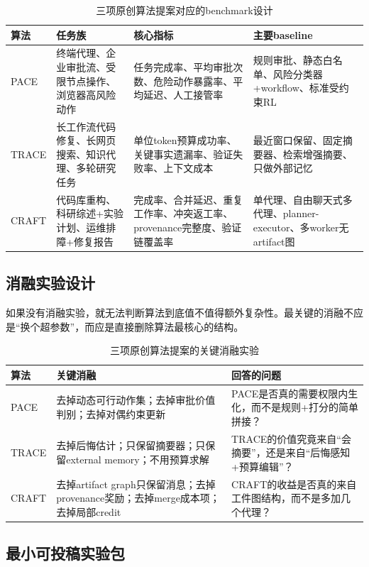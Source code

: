 \documentclass[12pt,a4paper]{article}
\begin{document}
\begin{table}[H]
\centering
\small
\caption{三项原创算法提案对应的benchmark设计}
\begin{tabular}{p{1.9cm}p{3.7cm}p{3.8cm}p{3.2cm}}
\toprule
\textbf{算法} & \textbf{任务族} & \textbf{核心指标} & \textbf{主要baseline} \\
\midrule
PACE & 终端代理、企业审批流、受限节点操作、浏览器高风险动作 & 任务完成率、平均审批次数、危险动作暴露率、平均延迟、人工接管率 & 规则审批、静态白名单、风险分类器+workflow、标准受约束RL \\
TRACE & 长工作流代码修复、长网页搜索、知识代理、多轮研究任务 & 单位token预算成功率、关键事实遗漏率、验证失败率、上下文成本 & 最近窗口保留、固定摘要器、检索增强摘要、只做外部记忆 \\
CRAFT & 代码库重构、科研综述+实验计划、运维排障+修复报告 & 完成率、合并延迟、重复工作率、冲突返工率、provenance完整度、验证链覆盖率 & 单代理、自由聊天式多代理、planner-executor、多worker无artifact图 \\
\bottomrule
\end{tabular}
\end{table}

\subsection{消融实验设计}

如果没有消融实验，就无法判断算法到底值不值得额外复杂性。最关键的消融不应是“换个超参数”，而应是直接删除算法最核心的结构。

\begin{table}[H]
\centering
\small
\caption{三项原创算法提案的关键消融实验}
\begin{tabular}{p{1.9cm}p{4.4cm}p{4.8cm}}
\toprule
\textbf{算法} & \textbf{关键消融} & \textbf{回答的问题} \\
\midrule
PACE & 去掉动态可行动作集；去掉审批价值判别；去掉对偶约束更新 & PACE是否真的需要权限内生化，而不是规则+打分的简单拼接？ \\
TRACE & 去掉后悔估计；只保留摘要器；只保留external memory；不用预算求解 & TRACE的价值究竟来自“会摘要”，还是来自“后悔感知+预算编辑”？ \\
CRAFT & 去掉artifact graph只保留消息；去掉provenance奖励；去掉merge成本项；去掉局部credit & CRAFT的收益是否真的来自工件图结构，而不是多加几个代理？ \\
\bottomrule
\end{tabular}
\end{table}

\subsection{最小可投稿实验包}
\end{document}
